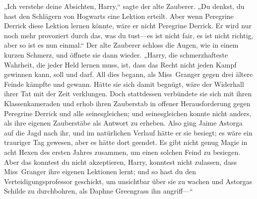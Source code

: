 „Ich verstehe deine Absichten, Harry,“ sagte der alte Zauberer. „Du denkst, du hast den Schlägern von Hogwarts eine Lektion erteilt. Aber wenn Peregrine Derrick diese Lektion lernen könnte, wäre er nicht Peregrine Derrick. Er wird nur noch mehr provoziert durch das, was du tust—es ist nicht fair, es ist nicht richtig, aber so ist es nun einmal.“ Der alte Zauberer schloss die Augen, wie in einem kurzen Schmerz, und öffnete sie dann wieder. „Harry, die schmerzhafteste Wahrheit, die jeder Held lernen muss, ist, dass das Recht nicht jeden Kampf gewinnen kann, soll und darf. All dies begann, als Miss~Granger gegen drei ältere Feinde kämpfte und gewann. Hätte sie sich damit begnügt, wäre der Widerhall ihrer Tat mit der Zeit verklungen. Doch stattdessen verbündete sie sich mit ihren Klassenkameraden und erhob ihren Zauberstab in offener Herausforderung gegen Peregrine Derrick und alle seinesgleichen; und seinesgleichen konnte nicht anders, als ihre eigenen Zauberstäbe als Antwort zu erheben. Also ging Jaime Astorga auf die Jagd nach ihr, und im natürlichen Verlauf hätte er sie besiegt; es wäre ein trauriger Tag gewesen, aber es hätte dort geendet. Es gibt nicht genug Magie in acht Hexen des ersten Jahres zusammen, um einen solchen Feind zu besiegen. Aber das konntest du nicht akzeptieren, Harry, konntest nicht zulassen, dass Miss~Granger ihre eigenen Lektionen lernt; und so hast du den Verteidigungsprofessor geschickt, um unsichtbar über sie zu wachen und Astorgas Schilde zu durchbohren, als Daphne Greengrass ihn angriff—“

